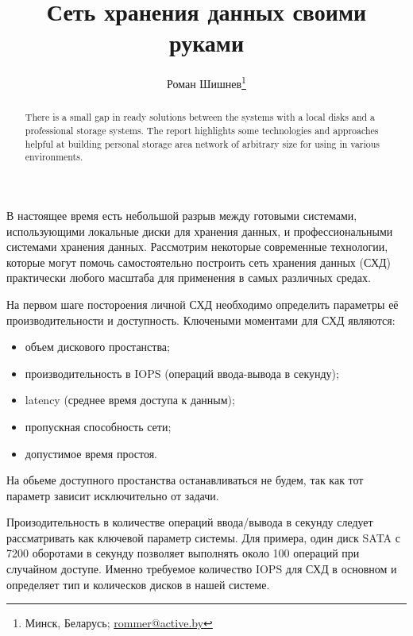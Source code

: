 \documentclass[10pt, a5paper]{article}
\begin{document}
\title{Сеть хранения данных своими руками}%

\author{Роман Шишнев\footnote{Минск, Беларусь; \url{rommer@active.by}}}
\maketitle

\begin{abstract}
There is a small gap in ready solutions between the systems with a local disks and a professional storage systems. The report highlights some technologies and approaches helpful at building personal storage area network of arbitrary size for using in various environments.
\end{abstract}

В настоящее время есть небольшой разрыв между готовыми системами, использующими локальные диски для хранения данных, и профессиональными системами хранения данных. Рассмотрим некоторые современные технологии, которые могут помочь самостоятельно построить сеть хранения данных (СХД) практически любого масштаба для применения в самых различных средах.

На первом шаге постороения личной СХД необходимо определить параметры её производительности и доступность. Ключеными моментами для СХД являются:

\begin{itemize}
  \item объем дискового простанства;
  \item производительность в IOPS (операций ввода-вывода в секунду);
  \item latency (среднее время доступа к данным);
  \item пропускная способность сети;
  \item допустимое время простоя.
\end{itemize}

На обьеме доступного простанства останавливаться не будем, так как тот параметр зависит исключительно от задачи.

Произодительность в количестве операций ввода/вывода в секунду следует рассматривать как ключевой параметр системы. Для примера, один диск SATA с 7200 оборотами в секунду позволяет выполнять около 100 операций при случайном доступе. Именно требуемое количество IOPS для СХД в основном и определяет тип и колическов дисков в нашей системе.
\end{document}
